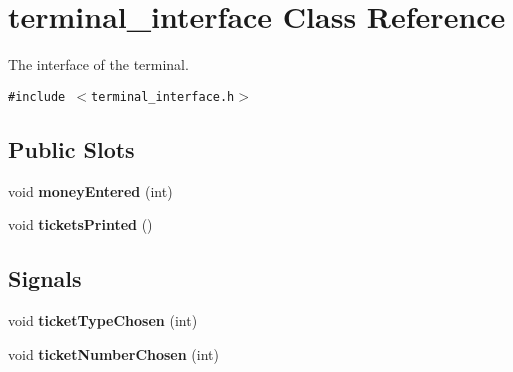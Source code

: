 \hypertarget{classterminal__interface}{
\section{terminal\_\-interface Class Reference}
\label{classterminal__interface}
}
The interface of the terminal.  


{\tt \#include $<$terminal\_\-interface.h$>$}

\subsection*{Public Slots}
\begin{CompactItemize}
\item 
\hypertarget{classterminal__interface_deb13b7db1db601ed1294c96ceca9a62}{
void \textbf{moneyEntered} (int)}
\label{classterminal__interface_deb13b7db1db601ed1294c96ceca9a62}

\item 
\hypertarget{classterminal__interface_c08585c14733aed705ee4a7eb82d2f56}{
void \textbf{ticketsPrinted} ()}
\label{classterminal__interface_c08585c14733aed705ee4a7eb82d2f56}

\end{CompactItemize}
\subsection*{Signals}
\begin{CompactItemize}
\item 
\hypertarget{classterminal__interface_6da7ff06e2acd833c1eac814c962377b}{
void \textbf{ticketTypeChosen} (int)}
\label{classterminal__interface_6da7ff06e2acd833c1eac814c962377b}

\item 
\hypertarget{classterminal__interface_62170f6b009dff3af79964dcc3532383}{
void \textbf{ticketNumberChosen} (int)}
\label{classterminal__interface_62170f6b009dff3af79964dcc3532383}

\end{CompactItemize}
